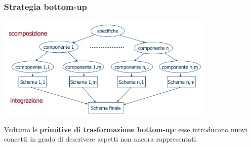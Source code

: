 \documentclass[12pt]{article}
\begin{document}
\subsubsection{Strategia bottom-up}
\begin{center}
    \includegraphics[width = 0.80\textwidth]{Images/65.PNG}
\end{center}
Vediamo le \textbf{primitive di trasformazione bottom-up}: esse introducono nuovi concetti in grado di descrivere aspetti non ancora rappresentati.
\end{document}
